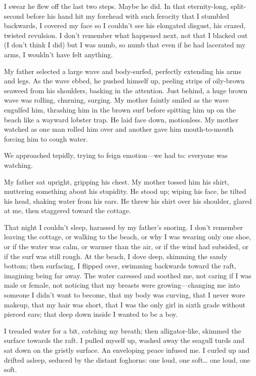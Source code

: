 I swear he flew off the last two steps. Maybe he did. In that
eternity-long, split-second before his hand hit my forehead with such
ferocity that I stumbled backwards, I covered my face so I couldn't see
his elongated disgust, his crazed, twisted revulsion. I don't remember
what happened next, not that I blacked out (I don't think I did) but I
was numb, so numb that even if he had lacerated my arms, I wouldn't have
felt anything.

My father selected a large wave and body-surfed, perfectly extending his
arms and legs. As the wave ebbed, he pushed himself up, peeling strips
of oily-brown seaweed from his shoulders, basking in the attention. Just
behind, a huge brown wave was rolling, churning, surging. My mother
faintly smiled as the wave engulfed him, thrashing him in the brown surf
before spitting him up on the beach like a wayward lobster trap. He laid
face down, motionless. My mother watched as one man rolled him over and
another gave him mouth-to-mouth forcing him to cough water.

We approached tepidly, trying to feign emotion---we had to: everyone was
watching.

My father sat upright, gripping his chest. My mother tossed him his
shirt, muttering something about his stupidity. He stood up; wiping his
face, he tilted his head, shaking water from his ears. He threw his
shirt over his shoulder, glared at me, then staggered toward the
cottage.

That night I couldn't sleep, harassed by my father's snoring. I don't
remember leaving the cottage, or walking to the beach, or why I was
wearing only one shoe, or if the water was calm, or warmer than the air,
or if the wind had subsided, or if the surf was still rough. At the
beach, I dove deep, skimming the sandy bottom; then surfacing, I flipped
over, swimming backwards toward the raft, imagining being far away. The
water caressed and soothed me, not caring if I was male or female, not
noticing that my breasts were growing---changing me into someone I
didn't want to become, that my body was curving, that I never wore
makeup, that my hair was short, that I was the only girl in sixth grade
without pierced ears; that deep down inside I wanted to be a boy.

I treaded water for a bit, catching my breath; then alligator-like,
skimmed the surface towards the raft. I pulled myself up, washed away
the seagull turds and sat down on the gristly surface. An enveloping
peace infused me. I curled up and drifted asleep, seduced by the distant
foghorns: one loud, one soft\ldots{} one loud, one soft.

